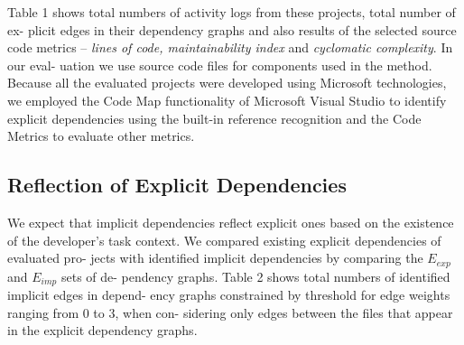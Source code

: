 \documentclass[a4paper]{llncs}
\begin{document}
\noindent
Table 1 shows total numbers of activity logs from these projects, total number of ex- plicit edges in their dependency graphs and also results of the selected source code metrics -- \textit{lines of code, maintainability index} and \textit{cyclomatic complexity}. In our eval- uation we use source code files for components used in the method. Because all the evaluated projects were developed using Microsoft technologies, we employed the Code Map  functionality of Microsoft Visual Studio to identify explicit dependencies using the built-in reference recognition and the Code Metrics to evaluate other metrics.
 
 \subsection{Reflection of Explicit Dependencies}
 We expect that implicit dependencies reflect explicit ones based on the existence of the developer’s task context. We compared existing explicit dependencies of evaluated pro- jects with identified implicit dependencies by comparing the \textit{$E_{exp}$} and \textit{$E_{imp}$} sets of de- pendency graphs. Table 2 shows total numbers of identified implicit edges in depend- ency graphs constrained by threshold for edge weights ranging from 0 to 3, when con- sidering only edges between the files that appear in the explicit dependency graphs.
 
\end{document}
